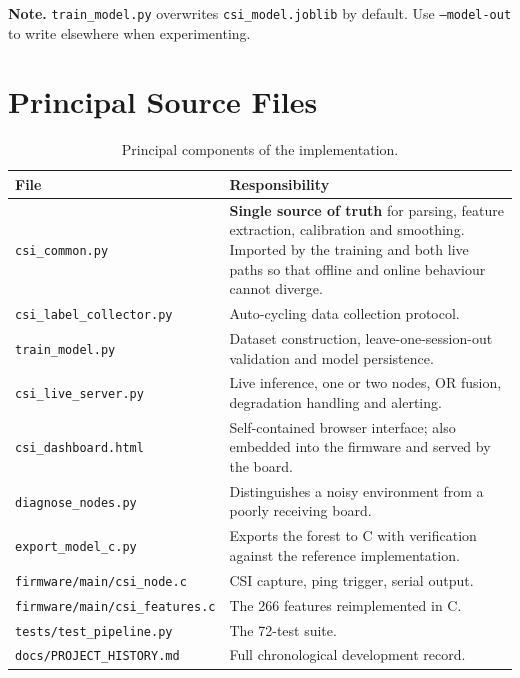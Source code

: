 \documentclass[11pt,a4paper]{article}
\newcommand{\code}[1]{\texttt{\small #1}}
\begin{document}
\noindent
\textbf{Note.} \code{train\_model.py} overwrites \code{csi\_model.joblib} by
default. Use \code{--model-out} to write elsewhere when experimenting.

\section{Principal Source Files}

\begin{table}[H]
\centering
\caption{Principal components of the implementation.}
\begin{tabularx}{\linewidth}{@{}lX@{}}
\toprule
\textbf{File} & \textbf{Responsibility} \\
\midrule
\code{csi\_common.py} & \textbf{Single source of truth} for parsing, feature
extraction, calibration and smoothing. Imported by the training and both live
paths so that offline and online behaviour cannot diverge. \\
\code{csi\_label\_collector.py} & Auto-cycling data collection protocol. \\
\code{train\_model.py} & Dataset construction, leave-one-session-out validation
and model persistence. \\
\code{csi\_live\_server.py} & Live inference, one or two nodes, OR fusion,
degradation handling and alerting. \\
\code{csi\_dashboard.html} & Self-contained browser interface; also embedded
into the firmware and served by the board. \\
\code{diagnose\_nodes.py} & Distinguishes a noisy environment from a poorly
receiving board. \\
\code{export\_model\_c.py} & Exports the forest to C with verification against
the reference implementation. \\
\code{firmware/main/csi\_node.c} & CSI capture, ping trigger, serial output. \\
\code{firmware/main/csi\_features.c} & The 266 features reimplemented in C. \\
\code{tests/test\_pipeline.py} & The 72-test suite. \\
\code{docs/PROJECT\_HISTORY.md} & Full chronological development record. \\
\bottomrule
\end{tabularx}
\end{table}
\end{document}
